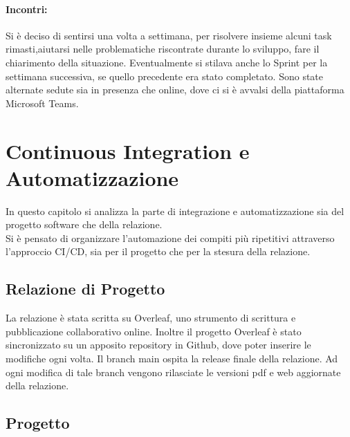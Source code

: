     \paragraph{Incontri: }
    Si è deciso di sentirsi una volta a settimana, per risolvere insieme alcuni task rimasti,aiutarsi nelle problematiche riscontrate durante lo sviluppo, fare il chiarimento della situazione. Eventualmente si stilava anche lo Sprint per la settimana successiva, se quello precedente era stato completato. Sono state alternate sedute sia in presenza che online, dove ci si è avvalsi della piattaforma Microsoft Teams.
    
     

\section{Continuous Integration e Automatizzazione}
\label{chap:CI}
In questo capitolo si analizza la parte di integrazione e automatizzazione sia del progetto software che della relazione.\\  Si è pensato di organizzare l'automazione dei compiti più ripetitivi attraverso l'approccio CI/CD, sia per il progetto che per la stesura della relazione.
    \subsection{Relazione di Progetto}
        La relazione è stata scritta su Overleaf, uno strumento di scrittura e pubblicazione collaborativo online.
        Inoltre il progetto Overleaf è stato sincronizzato su un apposito repository in Github, dove poter inserire le modifiche ogni volta. Il branch main ospita la release finale della relazione. Ad ogni modifica di tale branch vengono rilasciate le versioni pdf e web aggiornate della relazione. 
        
    \subsection{Progetto}
   
